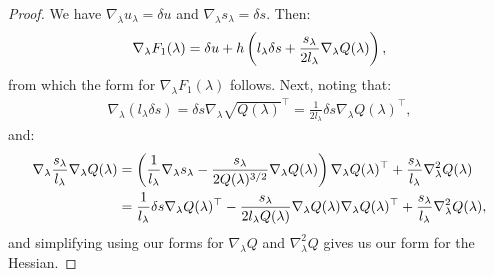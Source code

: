 \documentclass{article}
\begin{document}
\begin{proof}
  We have $\nabla_\lambda u_\lambda = \delta u$ and
  $\nabla_\lambda s_\lambda = \delta s$. Then:
  \begin{align*}
    \nabla_\lambda F_1(\lambda) = \delta u + h \left(l_\lambda \delta s + \frac{s_\lambda}{2 l_\lambda} \nabla_\lambda Q(\lambda)\right),
  \end{align*}
  from which the form for $\nabla_\lambda F_1(\lambda)$ follows. Next,
  noting that:
  \begin{align*}
    \nabla_\lambda (l_\lambda \delta s) = \delta s \nabla_\lambda \sqrt{Q(\lambda)}^\top = \frac{1}{2l_\lambda} \delta s \nabla_\lambda Q(\lambda)^\top,
  \end{align*}
  and:
  \begin{align*}
    \nabla_\lambda \frac{s_\lambda}{l_\lambda} \nabla_\lambda Q(\lambda)
    &= \left(\frac{1}{l_\lambda} \nabla_\lambda s_\lambda - \frac{s_\lambda}{2 Q(\lambda)^{3/2}} \nabla_\lambda Q(\lambda)\right) \nabla_\lambda Q(\lambda)^\top + \frac{s_\lambda}{l_\lambda} \nabla^2_\lambda Q(\lambda) \\
    &= \frac{1}{l_\lambda} \delta s \nabla_\lambda Q(\lambda)^\top - \frac{s_\lambda}{2 l_\lambda Q(\lambda)} \nabla_\lambda Q(\lambda) \nabla_\lambda Q(\lambda)^\top + \frac{s_\lambda}{l_\lambda} \nabla_\lambda^2 Q(\lambda),
  \end{align*}
  and simplifying using our forms for $\nabla_\lambda Q$ and
  $\nabla_\lambda^2 Q$ gives us our form for the Hessian.
\end{proof}
\end{document}

